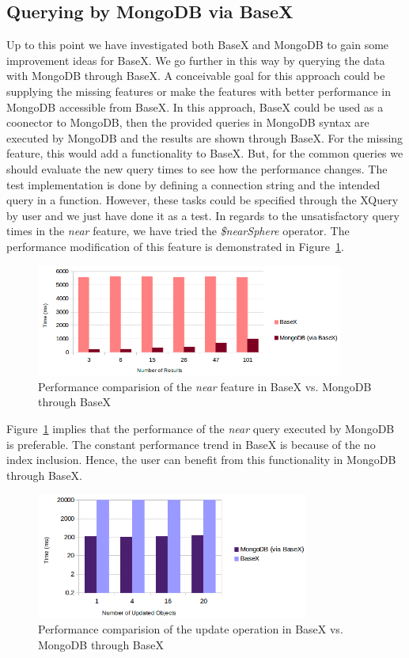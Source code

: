 \documentclass[a4paper,12pt]{article}
\begin{document}
\subsection{Querying by MongoDB via BaseX}
\label{MongoviaBX}
Up to this point we have investigated both BaseX and MongoDB to gain some improvement ideas for BaseX. We go further in this way by querying the data with MongoDB through BaseX. A conceivable goal for this approach could be supplying the missing features or make the features with better performance in MongoDB accessible from BaseX. In this approach, BaseX could be used as a coonector to MongoDB, then the provided queries in MongoDB syntax are executed by MongoDB and the results are shown through BaseX. For the missing feature, this would add a functionality to BaseX. But, for the common queries we should evaluate the new query times to see how the performance changes. 
The test implementation is done by defining a connection string and the intended query in a function. However, these tasks could be specified through the XQuery by user and we just have done it as a test. 
In regards to the unsatisfactory query times in the \textit{near} feature, we have tried the \textit{\$nearSphere} operator. The performance modification of this feature is demonstrated in Figure~\ref{figMongoviaBX-near}.
 
\begin{figure}
\centering
\includegraphics[width=0.9\textwidth]{MongoviaBX-near.png}
\caption{Performance comparision of the \textit{near} feature in BaseX vs. MongoDB through BaseX}
\label{figMongoviaBX-near}
\end{figure}

Figure~\ref{figMongoviaBX-near} implies that the performance of the \textit{near} query executed by MongoDB is preferable. The constant performance trend in BaseX is because of the no index inclusion. Hence, the user can benefit from this functionality in MongoDB through BaseX. 


\begin{figure}
\centering
\includegraphics[width=0.8\textwidth]{MongoviaBX-Update.png}
\caption{Performance comparision of the update operation in BaseX vs. MongoDB through BaseX}
\label{figMongoviaBX-update}
\end{figure}
\end{document}
